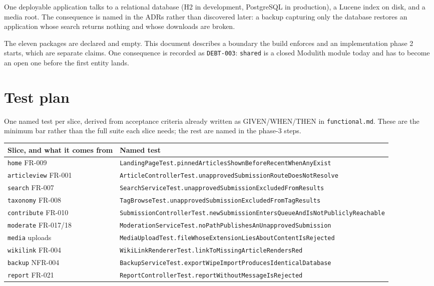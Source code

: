 \documentclass[11pt]{article}
\begin{document}
One deployable application talks to a relational database (H2 in development, PostgreSQL in
production), a Lucene index on disk, and a media root. The consequence is named in the ADRs rather
than discovered later: a backup capturing only the database restores an application whose search
returns nothing and whose downloads are broken.

The eleven packages are declared and empty. This document describes a boundary the build enforces and
an implementation phase 2 starts, which are separate claims. One consequence is recorded as
\texttt{DEBT-003}: \texttt{shared} is a closed Modulith module today and has to become an open one
before the first entity lands.

\section{Test plan}

One named test per slice, derived from acceptance criteria already written as GIVEN/WHEN/THEN in
\texttt{functional.md}. These are the minimum bar rather than the full suite each slice needs; the
rest are named in the phase-3 steps.

\vspace{0.4em}
{\scriptsize\setlength{\tabcolsep}{3pt}
\noindent\begin{tabular}{@{}l l@{}}
\toprule
\textbf{Slice, and what it comes from} & \textbf{Named test} \\
\midrule
\texttt{home} FR-009 & \texttt{LandingPageTest.pinnedArticlesShownBeforeRecentWhenAnyExist} \\
\texttt{articleview} FR-001 & \texttt{ArticleControllerTest.unapprovedSubmissionRouteDoesNotResolve} \\
\texttt{search} FR-007 & \texttt{SearchServiceTest.unapprovedSubmissionExcludedFromResults} \\
\texttt{taxonomy} FR-008 & \texttt{TagBrowseTest.unapprovedSubmissionExcludedFromTagResults} \\
\texttt{contribute} FR-010 & \texttt{SubmissionControllerTest.newSubmissionEntersQueueAndIsNotPubliclyReachable} \\
\texttt{moderate} FR-017/18 & \texttt{ModerationServiceTest.noPathPublishesAnUnapprovedSubmission} \\
\texttt{media} uploads & \texttt{MediaUploadTest.fileWhoseExtensionLiesAboutContentIsRejected} \\
\texttt{wikilink} FR-004 & \texttt{WikiLinkRendererTest.linkToMissingArticleRendersRed} \\
\texttt{backup} NFR-004 & \texttt{BackupServiceTest.exportWipeImportProducesIdenticalDatabase} \\
\texttt{report} FR-021 & \texttt{ReportControllerTest.reportWithoutMessageIsRejected} \\
\bottomrule
\end{tabular}}
\end{document}
